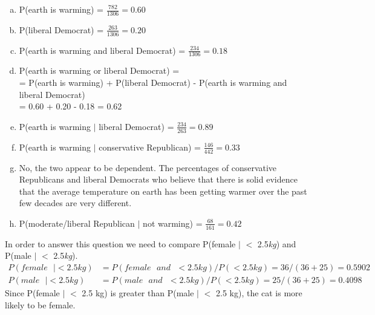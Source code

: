 {
\begin{enumerate}[(a)]
\item P(earth is warming) = $\frac{782}{1306} = 0.60$
\item P(liberal Democrat) = $\frac{263}{1306} = 0.20$
\item P(earth is warming and liberal Democrat) = $\frac{234}{1306} = 0.18$
\item P(earth is warming or liberal Democrat) = \\
= P(earth is warming) + P(liberal Democrat)  - P(earth is warming and liberal Democrat) \\
= 0.60 + 0.20 - 0.18 = 0.62
\item P(earth is warming $|$ liberal Democrat) = $\frac{234}{263} = 0.89$
\item P(earth is warming $|$ conservative Republican) = $\frac{146}{442} = 0.33$
\item No, the two appear to be dependent. The percentages of conservative Republicans and liberal Democrats who believe that there is solid evidence that the average temperature on earth has been getting warmer over the past few decades are very different.
\item P(moderate/liberal Republican $|$ not warming) = $\frac{68}{161} = 0.42$
\end{enumerate}
}



{
In order to answer this question we need to compare P(female $|$ $<$ 2.5\textit{kg}) and P(male $|$ $<$ 2.5\textit{kg}).
\begin{align*}
P(female\text{ }| < 2.5 kg) &= P(female\text{ }and\text{ }< 2.5 kg)  / P(< 2.5 kg)  = 36 / (36 + 25) = 0.5902 \\
P(male\text{ }| < 2.5 kg) &= P(male\text{ }and\text{ }< 2.5 kg)  / P(< 2.5 kg)  = 25 / (36 + 25) = 0.4098
\end{align*}
Since P(female $|$ $<$ 2.5 kg) is greater than P(male $|$ $<$ 2.5 kg), the cat is more likely to be female.
}


